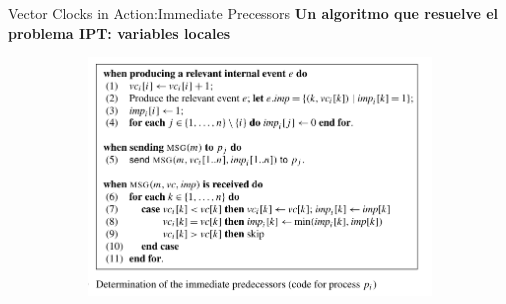 \begin{frame}[fragile]{Vector Clocks in Action:}{Immediate Precessors}
    \justifying
    \textbf{Un algoritmo que resuelve el problema IPT: variables locales}
    \begin{figure}
        \centering
        \begin{subfigure}[b]{\textwidth}
            \includegraphics[scale=0.7]{Imagenes/algoIPT.png}
            \label{fig:ejemplo1}
        \end{subfigure}
    \end{figure}
\end{frame}